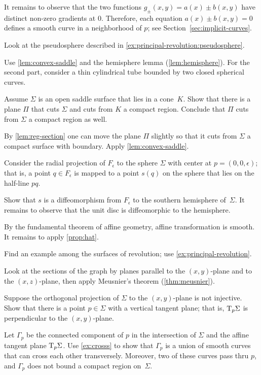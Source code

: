 \begin{multicols}{2}
It remains to observe that the two functions $g_\pm(x,y)=a(x)\pm b(x,y)$ have distinct non-zero gradients at $0$.
Therefore, each equation $a(x)\pm b(x,y) =0$ defines a smooth curve in a neighborhood of $p$;
see Section~\ref{sec:implicit-curves}.

 Look at the pseudosphere described in \ref{ex:principal-revolution:pseudosphere}.

Use \ref{lem:convex-saddle} and the hemisphere lemma (\ref{lem:hemisphere}).
For the second part, consider a thin cylindrical tube bounded by two closed spherical curves.

Assume $\Sigma$ is an open saddle surface that lies in a cone~$K$.
Show that there is a plane $\Pi$ that cuts $\Sigma$ and cuts from $K$ a compact region.
Conclude that $\Pi$ cuts from $\Sigma$ a compact region as well. 

By \ref{lem:reg-section} one can move the plane $\Pi$ slightly so that it cuts from $\Sigma$ a compact surface with boundary.
Apply \ref{lem:convex-saddle}.


Consider the radial projection of $F_\epsilon$ to the sphere $\Sigma$ with center at $p=(0,0,\epsilon)$;
that is, a point $q\in F_\epsilon$ is mapped to a point $s(q)$ on the sphere that lies on the half-line $pq$.

Show that $s$ is a diffeomorphism from $F_\epsilon$ to the southern hemisphere of~$\Sigma$.
It remains to observe that the unit disc is diffeomorphic to the hemisphere.

By the fundamental theorem of affine geometry, affine transformation is smooth.
It remains to apply \ref{prop:hat}.

Find an example among the surfaces of revolution;
use \ref{ex:principal-revolution}.

 Look at the sections of the graph by planes parallel to the $(x,y)$-plane and to the $(x,z)$-plane, then apply Meusnier’s theorem (\ref{thm:meusnier}).

Suppose the orthogonal projection of $\Sigma$ to the $(x,y)$-plane is not injective.
Show that there is a point $p\in\Sigma$ with a vertical tangent plane;
that is, $\mathrm{T}_p\Sigma$ is perpendicular to the $(x,y)$-plane.

Let $\Gamma_p$ be the connected component of $p$ in the intersection of $\Sigma$ and the affine tangent plane $\mathrm{T}_p\Sigma$.
Use \ref{ex:crosss} to show that $\Gamma_p$ is a union of smooth curves that can cross each other transversely.
Moreover, two of these curves pass thru $p$, and $\Gamma_p$ does not bound a compact region on~$\Sigma$.


\end{multicols}

